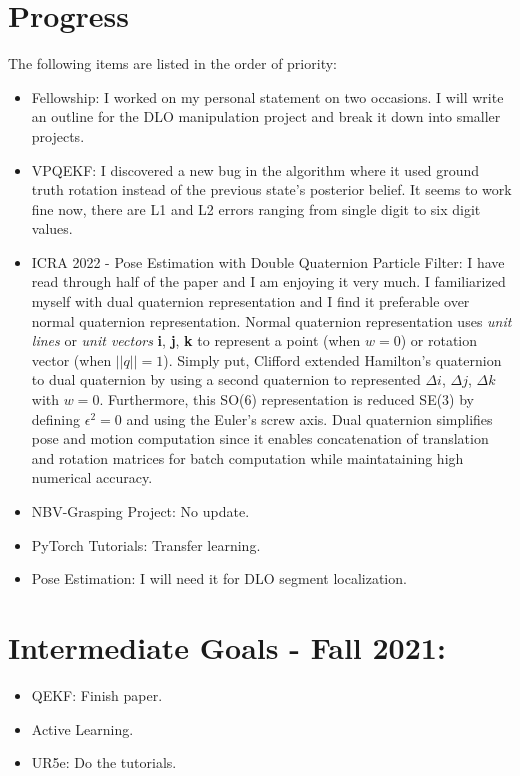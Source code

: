 \documentclass[11pt]{article}
\begin{document}
\section{Progress}
The following items are listed in the order of priority:
\begin{itemize}
      \item Fellowship: I worked on my personal statement on two occasions. I will
      write an outline for the DLO manipulation project and break it down into smaller
      projects.
      \item VPQEKF: I discovered a new bug in the algorithm where it used ground truth
      rotation instead of the previous state's posterior belief. It seems to work fine now, there are L1 and L2 errors ranging from single digit to six digit values.

      \item ICRA 2022 - Pose Estimation with Double Quaternion Particle Filter:
      I have read through half of the paper and I am enjoying it very much. I
      familiarized myself with dual quaternion representation and I find it preferable
      over normal quaternion representation. Normal quaternion representation uses
      \textit{unit lines} or \textit{unit vectors} \textbf{i}, \textbf{j},
      \textbf{k} to represent a point (when \(w=0\)) or rotation vector (when \(||q||=1\)).
      Simply put, Clifford extended Hamilton's quaternion to dual quaternion by using
      a second quaternion to represented \textbf{ \(\Delta i\)},
      \textbf{\(\Delta j\)}, \textbf{\(\Delta k\)} with \(w=0\). Furthermore, this
      SO(6) representation is reduced SE(3) by defining \(\epsilon^2 = 0\) and using
      the Euler's screw axis. Dual quaternion simplifies pose and motion
      computation since it enables concatenation of translation and rotation
      matrices for batch computation while
      maintataining high numerical accuracy.

      \item NBV-Grasping Project: No update.
      \item PyTorch Tutorials: Transfer learning.
      \item Pose Estimation: I will need it for DLO segment localization.

\end{itemize}


\section{Intermediate Goals - Fall 2021:}
\begin{itemize}
      \item QEKF: Finish paper.
      \item Active Learning.
      \item UR5e: Do the tutorials.
\end{itemize}


\newpage


\end{document}
